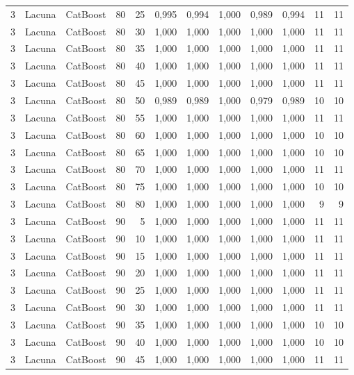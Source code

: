 \begin{longtable}{ccclrrrrrrrr}
3 & Lacuna & CatBoost & 80 & 25 & 0,995 & 0,994 & 1,000 & 0,989 & 0,994 & 11 & 11 \\
3 & Lacuna & CatBoost & 80 & 30 & 1,000 & 1,000 & 1,000 & 1,000 & 1,000 & 11 & 11 \\
3 & Lacuna & CatBoost & 80 & 35 & 1,000 & 1,000 & 1,000 & 1,000 & 1,000 & 11 & 11 \\
3 & Lacuna & CatBoost & 80 & 40 & 1,000 & 1,000 & 1,000 & 1,000 & 1,000 & 11 & 11 \\
3 & Lacuna & CatBoost & 80 & 45 & 1,000 & 1,000 & 1,000 & 1,000 & 1,000 & 11 & 11 \\
3 & Lacuna & CatBoost & 80 & 50 & 0,989 & 0,989 & 1,000 & 0,979 & 0,989 & 10 & 10 \\
3 & Lacuna & CatBoost & 80 & 55 & 1,000 & 1,000 & 1,000 & 1,000 & 1,000 & 11 & 11 \\
3 & Lacuna & CatBoost & 80 & 60 & 1,000 & 1,000 & 1,000 & 1,000 & 1,000 & 10 & 10 \\
3 & Lacuna & CatBoost & 80 & 65 & 1,000 & 1,000 & 1,000 & 1,000 & 1,000 & 10 & 10 \\
3 & Lacuna & CatBoost & 80 & 70 & 1,000 & 1,000 & 1,000 & 1,000 & 1,000 & 11 & 11 \\
3 & Lacuna & CatBoost & 80 & 75 & 1,000 & 1,000 & 1,000 & 1,000 & 1,000 & 10 & 10 \\
3 & Lacuna & CatBoost & 80 & 80 & 1,000 & 1,000 & 1,000 & 1,000 & 1,000 & 9 & 9 \\
3 & Lacuna & CatBoost & 90 & 5 & 1,000 & 1,000 & 1,000 & 1,000 & 1,000 & 11 & 11 \\
3 & Lacuna & CatBoost & 90 & 10 & 1,000 & 1,000 & 1,000 & 1,000 & 1,000 & 11 & 11 \\
3 & Lacuna & CatBoost & 90 & 15 & 1,000 & 1,000 & 1,000 & 1,000 & 1,000 & 11 & 11 \\
3 & Lacuna & CatBoost & 90 & 20 & 1,000 & 1,000 & 1,000 & 1,000 & 1,000 & 11 & 11 \\
3 & Lacuna & CatBoost & 90 & 25 & 1,000 & 1,000 & 1,000 & 1,000 & 1,000 & 11 & 11 \\
3 & Lacuna & CatBoost & 90 & 30 & 1,000 & 1,000 & 1,000 & 1,000 & 1,000 & 11 & 11 \\
3 & Lacuna & CatBoost & 90 & 35 & 1,000 & 1,000 & 1,000 & 1,000 & 1,000 & 10 & 10 \\
3 & Lacuna & CatBoost & 90 & 40 & 1,000 & 1,000 & 1,000 & 1,000 & 1,000 & 10 & 10 \\
3 & Lacuna & CatBoost & 90 & 45 & 1,000 & 1,000 & 1,000 & 1,000 & 1,000 & 11 & 11 \\

\end{longtable}
